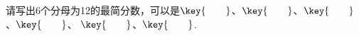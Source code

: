 请写出6个分母为12的最简分数，可以是$\key{\qquad}$、$\key{\qquad}$、$\key{\qquad}$、$\key{\qquad}$、
$\key{\qquad}$、$\key{\qquad}$.